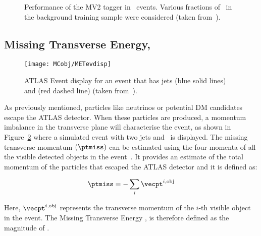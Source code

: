 			\begin{figure}[!htb]
				\begin{center}
					\hspace{0.05\textwidth}
				\end{center}
				\caption{Performance of the MV2 tagger in \ttbar\ events. Various fractions of \cjs\ in the background training sample were considered (taken from~\cite{ATL-PHYS-PUB-2016-012}).}
				\label{fig:btagEff}
			\end{figure}
			



		\subsection*{Missing Transverse Energy, \met}

			\begin{figure}[!htb]
				\centering
				\texttt{[image: MCobj/METevdisp]}
				\caption{\label{fig:METevdisp}ATLAS Event display for an event that has jets (blue solid lines) and \met (red dashed line) (taken from~\cite{METevdisp}).}
			\end{figure}

			As previously mentioned, particles like neutrinos or potential \ac{DM} candidates escape the \ac{ATLAS} detector. When these particles are produced, a momentum imbalance in the transverse plane will characterise the event, as shown in Figure~\ref{fig:METevdisp} where a simulated event with two jets and \met\ is displayed. The missing transverse momentum $\left ( \ptmiss \right )$ can be estimated using the four-momenta of all the visible detected objects in the event~\cite{ATLASMet2015}. It provides an estimate of the total momentum of the particles that escaped the \ac{ATLAS} detector and it is defined as: 

			\begin{equation}
				\ptmiss = - \sum_i \vecpt^{i, \mathrm{obj}}
				\label{eq:ptmiss}
			\end{equation}

			\noindent Here, $\vecpt^{i, \mathrm{obj}}$ represents the transverse momentum of the $i$-th visible object in the event. The Missing Transverse Energy \met, is therefore defined as the magnitude of \ptmiss. 

